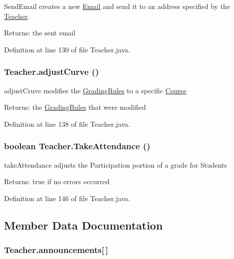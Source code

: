SendEmail creates a new \hyperlink{classEmail}{Email} and send it to an address specified by the \hyperlink{classTeacher}{Teacher}. 

\begin{Desc}
\item[Returns:]the sent email \end{Desc}


Definition at line 130 of file Teacher.java.\hypertarget{classTeacher_47598790c6388c6df08c2ce51512cfcd}{
\subsubsection{ Teacher.adjustCurve ()}}
\label{classTeacher_47598790c6388c6df08c2ce51512cfcd}


adjustCruve modifies the \hyperlink{classGradingRules}{GradingRules} to a specific \hyperlink{classCourse}{Course} 

\begin{Desc}
\item[Returns:]the \hyperlink{classGradingRules}{GradingRules} that were modified \end{Desc}


Definition at line 138 of file Teacher.java.\hypertarget{classTeacher_cc54c1c6fbc029a15a50901cfd3e057c}{
\subsubsection{\setlength{\rightskip}{0pt plus 5cm}boolean Teacher.TakeAttendance ()}}
\label{classTeacher_cc54c1c6fbc029a15a50901cfd3e057c}


takeAttendance adjusts the Participation portion of a grade for Students 

\begin{Desc}
\item[Returns:]true if no errors occurred \end{Desc}


Definition at line 146 of file Teacher.java.

\subsection{Member Data Documentation}
\hypertarget{classTeacher_f3509aec422e572e7f3bf9c99f4081a1}{
\subsubsection{ {\bf Teacher.announcements}\mbox{[}$\,$\mbox{]}}}
\label{classTeacher_f3509aec422e572e7f3bf9c99f4081a1}


